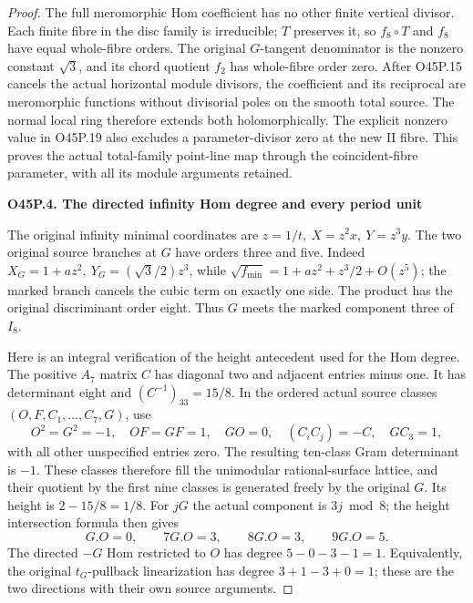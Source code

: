 \begin{proof}
The full meromorphic Hom coefficient has no other finite vertical
divisor. Each finite fibre in the disc family is irreducible;
\(T\) preserves it, so \(f_8\circ T\) and \(f_8\) have equal
whole-fibre orders. The original \(G\)-tangent denominator is
the nonzero constant \(\sqrt3\), and its chord quotient \(f_2\)
has whole-fibre order zero. After O45P.15 cancels the actual
horizontal module divisors, the coefficient and its reciprocal
are meromorphic functions without divisorial poles on the smooth
total source. The normal local ring therefore extends both
holomorphically. The explicit nonzero value in O45P.19 also
excludes a parameter-divisor zero at the new II fibre.
This proves the actual total-family point-line map through the
coincident-fibre parameter, with all its module arguments retained.

\par

\medskip\noindent\textbf{O45P.4. The directed infinity Hom degree and every period unit}

\par\nobreak

The original infinity minimal coordinates are
\(z=1/t,\ X=z^2x,\ Y=z^3y\).
The two original source branches at \(G\) have orders three and
five. Indeed \(X_G=1+az^2,\ Y_G=(\sqrt3/2)z^3\), while
\(\sqrt{f_{\min}}=1+az^2+z^3/2+O(z^5)\); the marked branch
cancels the cubic term on exactly one side.
The product has the original discriminant order eight.
Thus \(G\) meets the marked component three of \(I_8\).

Here is an integral verification of the height antecedent used
for the Hom degree. The positive \(A_7\) matrix \(C\) has diagonal
two and adjacent entries minus one. It has determinant eight and
\((C^{-1})_{33}=15/8\). In the ordered actual source classes
\((O,F,C_1,\ldots,C_7,G)\), use
\[
 O^2=G^2=-1,\quad OF=GF=1,\quad GO=0,\quad
 (C_iC_j)=-C,\quad GC_3=1,
 \tag{O45P.20}
\]
with all other unspecified entries zero. The resulting ten-class
Gram determinant is \(-1\). These classes therefore fill the
unimodular rational-surface lattice, and their quotient by the
first nine classes is generated freely by the original \(G\).
Its height is \(2-15/8=1/8\).
For \(jG\) the actual component is \(3j\bmod8\); the height
intersection formula then gives
\[
 G.O=0,\qquad 7G.O=3,\qquad 8G.O=3,\qquad 9G.O=5.
 \tag{O45P.21}
\]
The directed \(-G\) Hom restricted to \(O\) has degree
\(5-0-3-1=1\). Equivalently, the original \(t_G\)-pullback
linearization has degree \(3+1-3+0=1\); these are the two
directions with their own source arguments.


\end{proof}
